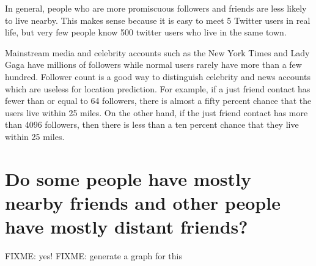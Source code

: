 In general, people who are more promiscuous followers and friends are less
likely to live nearby. This makes sense because it is easy to meet 5 Twitter
users in real life, but very few people know 500 twitter users who live in the
same town.

Mainstream media and celebrity accounts such as the New York Times and Lady
Gaga have millions of followers while normal users rarely have more than a few
hundred.
Follower count is a good way to distinguish celebrity and news accounts which
are useless for location prediction.
For example, if a just friend contact has fewer than or equal to 64 followers,
there is almost a fifty percent chance that the users live within 25 miles. On
the other hand, if the just friend contact has more than 4096 followers, then
there is less than a ten percent chance that they live within 25 miles.


\section{Do some people have mostly nearby friends and other people have mostly
distant friends?}
FIXME: yes!
FIXME: generate a graph for this

